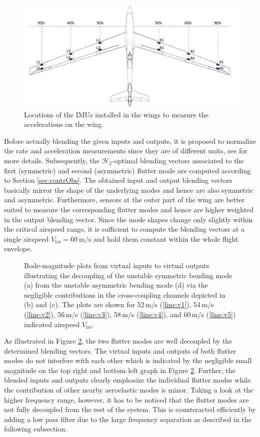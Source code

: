 \documentclass[aerospace,article,submit,moreauthors,pdftex,10pt,a4paper]{Definitions/mdpi}
\begin{document}
\begin{figure}[!h]	
	\centering
	\includegraphics[width=0.75\linewidth]{figs/SensorPos}
	\caption{Locations of the IMUs installed in the wings to measure the accelerations on the wing.}
	\label{fig:sens}
\end{figure}

Before actually blending the given inputs and outputs, it is proposed to normalize the rate and acceleration measurements since they are of different units, see \cite{Pusch2018} for more details. Subsequently, the $\mathcal{H}_{2}$-optimal blending vectors associated to the first (symmetric) and second (asymmetric) flutter mode are computed according to Section \ref{sec:contrObs}. 
The obtained input and output blending vectors basically mirror the shape of the underlying modes and hence are also symmetric and asymmetric. Furthermore, sensors at the outer part of the wing are better suited to measure the corresponding flutter modes and hence are higher weighted in the output blending vector.
Since the mode shapes change only slightly within the critical airspeed range, it is sufficient to compute the blending vectors at a single airspeed $V_\text{ias}=\SI{60}{\meter\per\second}$ and hold them constant within the whole flight envelope.

\begin{figure}[h]
	\centering
	
	\caption{Bode-magnitude plots from virtual inputs to virtual outputs illustrating the decoupling of the unstable symmetric bending mode (a) from the unstable asymmetric bending mode (d) via the negligible contributions in the cross-coupling channels depicted in (b) and (c). The plots are shown for 52\,m/s (\ref{line:v1}), 54\,m/s (\ref{line:v2}), 56\,m/s (\ref{line:v3}), 58\,m/s (\ref{line:v4}), and 60\,m/s (\ref{line:v5}) indicated airspeed $V_{\text{ias}}$.}
	\label{fig:bode}
\end{figure}

As illustrated in Figure \ref{fig:bode}, the two flutter modes are well decoupled by the determined blending vectors. The virtual inputs and outputs of both flutter modes do not interfere with each other which is indicated by the negligible small magnitude on the top right and bottom left graph in Figure \ref{fig:bode}. Further, the blended inputs and outputs clearly emphasize the individual flutter modes while the contribution of other nearby aeroelastic modes is minor. Taking a look at the higher frequency range, however, it has to be noticed that the flutter modes are not fully decoupled from the rest of the system. This is counteracted efficiently by adding a low pass filter due to the large frequency separation as described in the following subsection.
\end{document}
